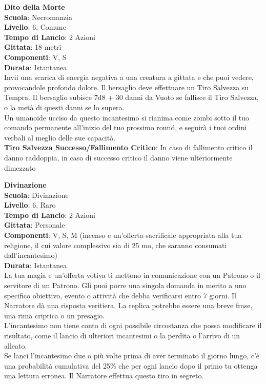 \begin{multicols}{2}
\medskip\textbf{Dito della Morte}\\
\textbf{Scuola}: Necromanzia\\
\textbf{Livello}: 6, Comune\\
\textbf{Tempo di Lancio}: 2 Azioni\\
\textbf{Gittata}: 18 metri\\
\textbf{Componenti}: V, S\\
\textbf{Durata}: Istantanea\\
Invii una scarica di energia negativa a una creatura a gittata e che puoi vedere, provocandole profondo dolore. Il bersaglio deve effettuare un Tiro Salvezza su Tempra. Il bersaglio subisce 7d8 + 30 danni da Vuoto se fallisce il Tiro Salvezza, o la metà di questi danni se lo supera.\\
Un umanoide ucciso da questo incantesimo si rianima come zombi sotto il tuo comando permanente all'inizio del tuo prossimo round, e seguirà i tuoi ordini verbali al meglio delle sue capacità.\\
\textbf{Tiro Salvezza Successo/Fallimento Critico}: In caso di fallimento critico il danno raddoppia, in caso di successo critico il danno viene ulteriormente dimezzato

\medskip\textbf{Divinazione}\\
\textbf{Scuola}: Divinazione\\
\textbf{Livello}: 6, Raro\\
\textbf{Tempo di Lancio}: 2 Azioni\\
\textbf{Gittata}: Personale\\
\textbf{Componenti}: V, S, M (incenso e un'offerta sacrificale appropriata alla tua religione, il cui valore complessivo sia di 25 mo, che saranno consumati dall'incantesimo)\\
\textbf{Durata}: Istantanea\\
La tua magia e un'offerta votiva ti mettono in comunicazione con un Patrono o il servitore di un Patrono. Gli puoi porre una singola domanda in merito a uno specifico obiettivo, evento o attività che debba verificarsi entro 7 giorni. Il Narratore dà una risposta veritiera. La replica potrebbe essere una breve frase, una rima criptica o un presagio. \\
L'incantesimo non tiene conto di ogni possibile circostanza che possa modificare il risultato, come il lancio di ulteriori incantesimi o la perdita o l'arrivo di un alleato.\\
Se lanci l'incantesimo due o più volte prima di aver terminato il giorno lungo, c'è una probabilità cumulativa del 25\% che per ogni lancio dopo il primo tu ottenga una lettura erronea. Il Narratore effettua questo tiro in segreto.


\end{multicols}
